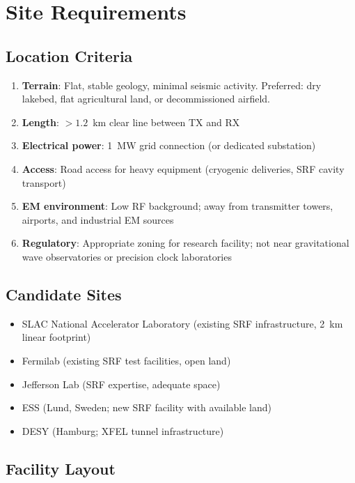 \documentclass[11pt,letterpaper]{article}
\begin{document}
\section{Site Requirements}

\subsection{Location Criteria}

\begin{enumerate}
\item \textbf{Terrain}: Flat, stable geology, minimal seismic activity.
Preferred: dry lakebed, flat agricultural land, or decommissioned airfield.
\item \textbf{Length}: $> 1.2$~km clear line between TX and RX
\item \textbf{Electrical power}: 1~MW grid connection (or dedicated
substation)
\item \textbf{Access}: Road access for heavy equipment (cryogenic
deliveries, SRF cavity transport)
\item \textbf{EM environment}: Low RF background; away from
transmitter towers, airports, and industrial EM sources
\item \textbf{Regulatory}: Appropriate zoning for research facility;
not near gravitational wave observatories or precision clock laboratories
\end{enumerate}

\subsection{Candidate Sites}

\begin{itemize}
\item SLAC National Accelerator Laboratory (existing SRF infrastructure,
2~km linear footprint)
\item Fermilab (existing SRF test facilities, open land)
\item Jefferson Lab (SRF expertise, adequate space)
\item ESS (Lund, Sweden; new SRF facility with available land)
\item DESY (Hamburg; XFEL tunnel infrastructure)
\end{itemize}

\subsection{Facility Layout}
\end{document}
